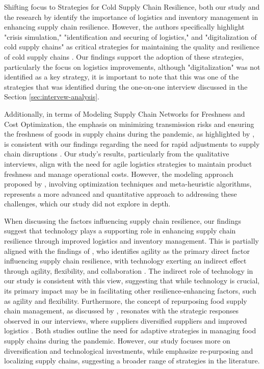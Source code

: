 Shifting focus to Strategies for Cold Supply Chain Resilience, both our study and the research by \textcite{Khan2023EnhancementCountry} identify the importance of logistics and inventory management in enhancing supply chain resilience. However, the authors specifically highlight "crisis simulation," "identification and securing of logistics," and "digitalization of cold supply chains" as critical strategies for maintaining the quality and resilience of cold supply chains \parencite{Khan2023EnhancementCountry}. Our findings support the adoption of these strategies, particularly the focus on logistics improvements, although "digitalization" was not identified as a key strategy, it is important to note that this was one of the strategies that was identified during the one-on-one interview discussed in the Section \ref{sec:intervew-analysis}. 

Additionally, in terms of Modeling Supply Chain Networks for Freshness and Cost Optimization, the emphasis on minimizing transmission risks and ensuring the freshness of goods in supply chains during the pandemic, as highlighted by \textcite{Asgharizadeh2023ModelingPandemic}, is consistent with our findings regarding the need for rapid adjustments to supply chain disruptions \parencite{Asgharizadeh2023ModelingPandemic}. Our study’s results, particularly from the qualitative interviews, align with the need for agile logistics strategies to maintain product freshness and manage operational costs. However, the modeling approach proposed by \textcite{Asgharizadeh2023ModelingPandemic}, involving optimization techniques and meta-heuristic algorithms, represents a more advanced and quantitative approach to addressing these challenges, which our study did not explore in depth.

When discussing the factors influencing supply chain resilience, our findings suggest that technology plays a supporting role in enhancing supply chain resilience through improved logistics and inventory management. This is partially aligned with the findings of \textcite{Ruamchart2023SupplyIndustry}, who identifies agility as the primary direct factor influencing supply chain resilience, with technology exerting an indirect effect through agility, flexibility, and collaboration \parencite{Ruamchart2023SupplyIndustry}. The indirect role of technology in our study is consistent with this view, suggesting that while technology is crucial, its primary impact may be in facilitating other resilience-enhancing factors, such as agility and flexibility. Furthermore, the concept of repurposing food supply chain management, as discussed by \textcite{Sangiumvibool-Howell2023RepurposingReview}, resonates with the strategic responses observed in our interviews, where suppliers diversified suppliers and improved logistics \parencite{Sangiumvibool-Howell2023RepurposingReview}. Both studies outline the need for adaptive strategies in managing food supply chains during the pandemic. However, our study focuses more on diversification and technological investments, while \textcite{Sangiumvibool-Howell2023RepurposingReview} emphasize re-purposing and localizing supply chains, suggesting a broader range of strategies in the literature.

